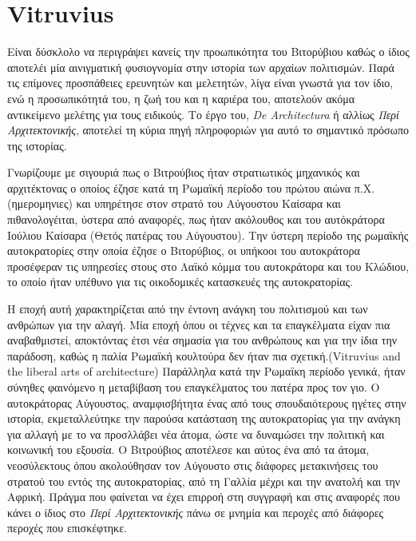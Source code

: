 
\section{Vitruvius}

\cite{elwiki:vitruvius,enwiki:vitruvius,vitruvius-lefas,masterson_status_2004,baldwin-1990}

Είναι δύσκλολο να περιγράψει κανείς την προωπικότητα του Βιτορύβιου καθώς ο ίδιος αποτελέι μία αινιγματική φυσιογνομία στην ιστορία των αρχαίων πολιτισμών. Παρά τις επίμονες προσπάθειες ερευνητών και μελετητών, λίγα είναι γνωστά για τον ίδιο, ενώ η προσωπικότητά του, η ζωή του και η καριέρα του, αποτελούν ακόμα αντικείμενο μελέτης για τους ειδικούς. Το έργο του, \emph{De Architectura} ή αλλίως \emph{Περί Αρχιτεκτονικής}, αποτελεί τη κύρια πηγή πληροφοριών για αυτό το σημαντικό πρόσωπο της ιστορίας. \cite{elwiki:vitruvius,enwiki:vitruvius,vitruvius-lefas,baldwin-1990,masterson_status_2004}

Γνωρίζουμε με σιγουριά πως ο Βιτρούβιος ήταν στρατιωτικός μηχανικός και αρχιτέκτονας ο οποίος έζησε κατά τη Ρωμαϊκή περίοδο του πρώτου αιώνα π.Χ. (ημερομηνιες) και υπηρέτησε στον στρατό του Αύγουστου Καίσαρα και πιθανολογέιται, ύστερα από αναφορές, πως ήταν ακόλουθος και του αυτόκράτορα Ιούλιου Καίσαρα (Θετός πατέρας του Αύγουστου). \cite{enwiki:vitruvius} Την ύστερη περίοδο της ρωμαϊκής αυτοκρατορίες στην οποία έζησε ο Βιτορύβιος, οι υπήκοοι του αυτοκράτορα προσέφεραν τις υπηρεσίες στους στο Λαϊκό κόμμα του αυτοκράτορα και του Κλώδιου, το οποίο ήταν υπέθυνο για τις οικοδομικές κατασκευές της αυτοκρατορίας. \cite[σ. 13]{vitruvius-lefas}

Η εποχή αυτή χαρακτηρίζεται από την έντονη ανάγκη του πολιτισμού και των ανθρώπων για την αλαγή. Μία εποχή όπου οι τέχνες και τα επαγκέλματα είχαν πια αναβαθμιστεί, αποκτόντας έτσι νέα σημασία για του ανθρώπους και για την ίδια την παράδοση, καθώς η παλία Ρωμαϊκή κουλτούρα δεν ήταν πια σχετική.(Vitruvius and the liberal arts of architecture) Παράλληλα κατά την Ρωμαϊκη περίοδο γενικά, ήταν σύνηθες φαινόμενο η μεταβίβαση του επαγκέλματος του πατέρα προς τον γιο. Ο αυτοκράτορας Αύγουστος, αναμφισβήτητα ένας από τους σπουδαιότερους ηγέτες στην ιστορία, εκμεταλλεύτηκε την παρούσα κατάσταση της αυτοκρατορίας για την ανάγκη για αλλαγή με το να προσλλάβει νέα άτομα, ώστε να δυναμώσει την πολιτική και κοινωνική του εξουσία. \cite[σ. 387]{asterson_status_2004} Ο Βιτρούβιος αποτέλεσε και αύτος ένα από τα άτομα, νεοσύλεκτους όπου ακολούθησαν τον Αύγουστο στις διάφορες μετακινήσεις του στρατού του εντός της αυτοκρατορίας, από τη Γαλλία μέχρι και την ανατολή και την Αφρική. Πράγμα που φαίνεται να έχει επιρροή στη συγγραφή και στις αναφορές που κάνει ο ίδιος στο \emph{Περί Αρχιτεκτονικής} πάνω σε μνημία και περοχές από διάφορες περοχές που επισκέφτηκε. \cite[σ. 13]{vitruvius-lefas}

